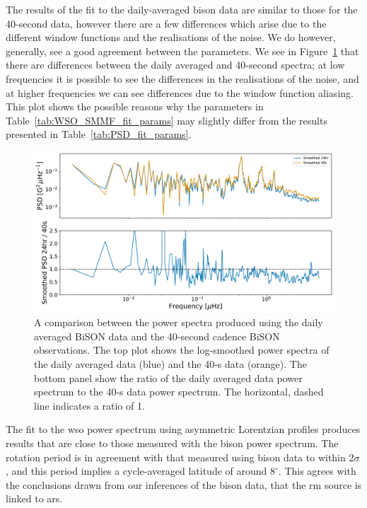 The results of the fit to the daily-averaged \gls{bison} data are similar to those for the 40-second data, however there are a few differences which arise due to the different window functions and the realisations of the noise. We do however, generally, see a good agreement between the parameters. We see in Figure~\ref{fig:BiSON_PSD_40_vs_24} that there are differences between the daily averaged and 40-second spectra; at low frequencies it is possible to see the differences in the realisations of the noise, and at higher frequencies we can see differences due to the window function aliasing. This plot shows the possible reasons why the parameters in Table~\ref{tab:WSO_SMMF_fit_params} may slightly differ from the results presented in Table~\ref{tab:PSD_fit_params}.

\begin{figure}[ht!]
	\centering
	\includegraphics[width=0.85\columnwidth]{BiSON_24h_vs_40s.pdf}
	\caption{A comparison between the power spectra produced using the daily averaged BiSON data and the 40-second cadence BiSON observations. The top plot shows the log-smoothed power spectra of the daily averaged data (blue) and the 40-s data (orange). The bottom panel show the ratio of the daily averaged data power spectrum to the 40-s data power spectrum. The horizontal, dashed line indicates a ratio of 1.}
	\label{fig:BiSON_PSD_40_vs_24}
\end{figure}


The fit to the \gls{wso} power spectrum using asymmetric Lorentzian profiles produces results that are close to those measured with the \gls{bison} power spectrum. The rotation period is in agreement with that measured using \gls{bison} data to within 2$\sigma$, and this period implies a cycle-averaged latitude of around $8^{\circ}$. This agrees with the conclusions drawn from our inferences of the \gls{bison} data, that the \gls{rm} source is linked to \glspl{ar}.

